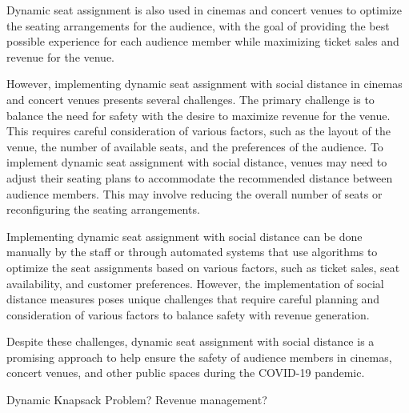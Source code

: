 Dynamic seat assignment is also used in cinemas and concert venues to optimize the seating arrangements for the audience, with the goal of providing the best possible experience for each audience member while maximizing ticket sales and revenue for the venue.

However, implementing dynamic seat assignment with social distance in cinemas and concert venues presents several challenges. The primary challenge is to balance the need for safety with the desire to maximize revenue for the venue. This requires careful consideration of various factors, such as the layout of the venue, the number of available seats, and the preferences of the audience. To implement dynamic seat assignment with social distance, venues may need to adjust their seating plans to accommodate the recommended distance between audience members. This may involve reducing the overall number of seats or reconfiguring the seating arrangements.

Implementing dynamic seat assignment with social distance can be done manually by the staff or through automated systems that use algorithms to optimize the seat assignments based on various factors, such as ticket sales, seat availability, and customer preferences. However, the implementation of social distance measures poses unique challenges that require careful planning and consideration of various factors to balance safety with revenue generation.

Despite these challenges, dynamic seat assignment with social distance is a promising approach to help ensure the safety of audience members in cinemas, concert venues, and other public spaces during the COVID-19 pandemic.

Dynamic Knapsack Problem? Revenue management?






